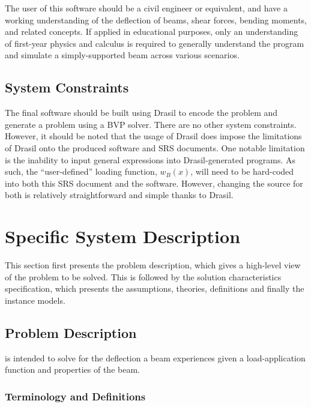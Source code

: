 \documentclass[12pt]{article}
\begin{document}
The user of this software should be a civil engineer or equivalent, and have a
working understanding of the deflection of beams, shear forces, bending moments,
and related concepts. If applied in educational purposes, only an understanding
of first-year physics and calculus is required to generally understand the
program and simulate a simply-supported beam across various scenarios.

\subsection{System Constraints}

The final software should be built using Drasil to encode the problem and
generate a problem using a BVP solver. There are no other system constraints.
However, it should be noted that the usage of Drasil does impose the limitations
of Drasil onto the produced software and SRS documents. One notable limitation
is the inability to input general expressions into Drasil-generated programs. As
such, the ``user-defined'' loading function, \(w_{B}(x)\), will need to be
hard-coded into both this SRS document and the software. However, changing the
source for both is relatively straightforward and simple thanks to Drasil.

\newpage


\section{Specific System Description}
\label{sec_ssd}

This section first presents the problem description, which gives a high-level
view of the problem to be solved.  This is followed by the solution
characteristics specification, which presents the assumptions, theories,
definitions and finally the instance models.

\subsection{Problem Description}
\label{Sec_pd}

\progname{} is intended to solve for the deflection a beam experiences given a
load-application function and properties of the beam.

\subsubsection{Terminology and  Definitions}
\end{document}
